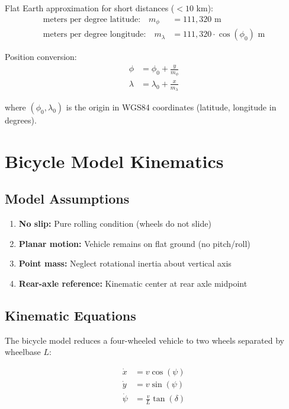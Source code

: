 \documentclass[11pt,a4paper]{article}
\begin{document}
Flat Earth approximation for short distances ($<10$ km):
\begin{align}
\text{meters per degree latitude:} \quad m_{\phi} &= 111{,}320 \text{ m} \\
\text{meters per degree longitude:} \quad m_{\lambda} &= 111{,}320 \cdot \cos(\phi_0) \text{ m}
\end{align}

Position conversion:
\begin{align}
\phi &= \phi_0 + \frac{y}{m_{\phi}} \\
\lambda &= \lambda_0 + \frac{x}{m_{\lambda}}
\end{align}

where $(\phi_0, \lambda_0)$ is the origin in WGS84 coordinates (latitude, longitude in degrees).

\section{Bicycle Model Kinematics}

\subsection{Model Assumptions}

\begin{enumerate}
    \item \textbf{No slip:} Pure rolling condition (wheels do not slide)
    \item \textbf{Planar motion:} Vehicle remains on flat ground (no pitch/roll)
    \item \textbf{Point mass:} Neglect rotational inertia about vertical axis
    \item \textbf{Rear-axle reference:} Kinematic center at rear axle midpoint
\end{enumerate}

\subsection{Kinematic Equations}

The bicycle model reduces a four-wheeled vehicle to two wheels separated by wheelbase $L$:

\begin{equation}
\begin{aligned}
\dot{x} &= v \cos(\psi) \\
\dot{y} &= v \sin(\psi) \\
\dot{\psi} &= \frac{v}{L} \tan(\delta)
\end{aligned}
\label{eq:bicycle_model}
\end{equation}
\end{document}
